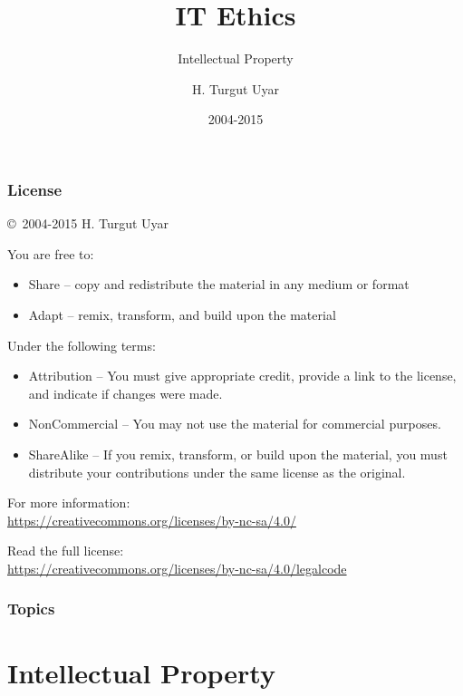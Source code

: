 \documentclass[dvipsnames]{beamer}
\title{IT Ethics}
\subtitle{Intellectual Property}
\author{H. Turgut Uyar}
\date{2004-2015}
\theoremstyle{definition}
\theoremstyle{example}
\theoremstyle{plain}
\begin{document}
\begin{frame}
  \titlepage
\end{frame}

\begin{frame}
  \frametitle{License}

  \hfill
  \copyright~2004-2015 H. Turgut Uyar

  \vfill
  \begin{footnotesize}
    You are free to:
    \begin{itemize}
      \itemsep0em
      \item Share -- copy and redistribute the material in any medium or format
      \item Adapt -- remix, transform, and build upon the material
    \end{itemize}

    Under the following terms:
    \begin{itemize}
      \itemsep0em
      \item Attribution -- You must give appropriate credit, provide a link to
        the license, and indicate if changes were made.

      \item NonCommercial -- You may not use the material for commercial
        purposes.

      \item ShareAlike -- If you remix, transform, or build upon the material,
        you must distribute your contributions under the same license as the
        original.
    \end{itemize}
  \end{footnotesize}

  \begin{small}
    For more information:\\
    \url{https://creativecommons.org/licenses/by-nc-sa/4.0/}

    \smallskip
    Read the full license:\\
    \url{https://creativecommons.org/licenses/by-nc-sa/4.0/legalcode}
  \end{small}
\end{frame}

\begin{frame}
  \frametitle{Topics}
  \tableofcontents
\end{frame}

\section{Intellectual Property}
\end{document}
